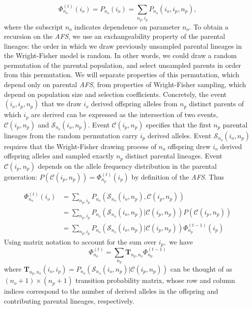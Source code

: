 \documentclass[review,nonatbib]{elsarticle}
\newcommand{\afs}[2]{\Phi_{#1}^{(#2)}}
\begin{document}
\begin{equation}
  \afs{n_o}{t}(i_o)=P_{n_o} (i_o) =\sum_{n_p,i_p} P_{n_o}(i_o,i_p,n_p),
\end{equation}
where the subscript $n_o$ indicates dependence on parameter $n_o$. To obtain a recursion on the
\textit{AFS}, we use an exchangeability property of the parental lineages: the order
 in which we draw previously unsampled parental lineages in the Wright-Fisher
model is random. 
In other words, we could draw a random permutation of the parental population, and select unsampled parents
in order from this permutation. We will separate properties of this permutation, which depend only
on parental \textit{AFS}, from properties of Wright-Fisher sampling, which depend on population
size and selection coefficients.  Concretely, the event $(i_o, i_p,n_p)$ that we draw $i_o$ derived offspring 
alleles from $n_p$ distinct parents of which $i_p$ are derived can be expressed as the intersection of two events,
$\mathcal{C}(i_p,n_p)$ and $\mathcal{S}_{n_o}(i_o, n_p)$. Event $\mathcal{C}(i_p,n_p)$ specifies that the
first $n_p$ parental lineages from the random permutation carry $i_p$ derived alleles. Event
$\mathcal{S}_{n_o}(i_o, n_p)$ requires that the Wright-Fisher drawing process of $n_o$ offspring drew $i_o$ derived offspring alleles 
and sampled exactly $n_p$ distinct parental lineages. Event $\mathcal{C}(i_p, n_p)$ depends on the allele
frequency distribution in the parental generation: $P(\mathcal{C}(i_p,n_p)) =\afs{n_p}{t} (i_p)$
by definition of the \textit{AFS}. Thus 

\begin{equation}
  \begin{split}
    \afs{n_o}{t}(i_o)&= \sum_{n_p,i_p} P_{n_o}(\mathcal{S}_{n_o}(i_o, n_p), \mathcal{C}(i_p,n_p) )\\
    &=   \sum_{n_p,i_p} P_{n_o}(\mathcal{S}_{n_o}(i_o, n_p)| \mathcal{C}(i_p,n_p) ) P(\mathcal{C}(i_p,n_p))\\
    &=   \sum_{n_p,i_p} P_{n_o}(\mathcal{S}_{n_o}(i_o, n_p)| \mathcal{C}(i_p,n_p) )  \afs{n_p}{t-1}(i_p)%
  \end{split}
\end{equation}
Using matrix notation to account for the sum over $i_p,$ we have 
\begin{equation}
  \afs{n_o}{t} = \sum_{n_p}  \mathbf{T}_{n_p,n_o}     \afs{n_p}{t-1}
    \label{eq_recur}
  \end{equation}
where $\mathbf{T}_{n_p,n_o}(i_o,i_p) = P_{n_o}(\mathcal{S}_{n_o}(i_o, n_p)| \mathcal{C}(i_p,n_p) ) $ can be thought of as $(n_o+1) \times (n_p+1)$ transition
probability matrix, whose row and column indices correspond to the number of derived alleles in the
offspring and contributing parental lineages, respectively.
\end{document}
